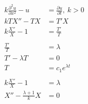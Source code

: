 \documentclass{article}
\begin{document}
\begin{align*}
  k \frac{\partial^2 u}{\partial x^2} - u & = \frac{\partial u}{\partial t},\ k > 0                                                                                                                                                                                                   \\
  k T X'' - T X                           & = T' X                                                                                                                                                                                                                                    \\
  k \frac{X''}{X} - 1                     & = \frac{T'}{T}                                                                                                                                                                                                                            \\ \\
  \frac{T'}{T}                            & = \lambda                                                                                                                                                                                                                                 \\
  T' - \lambda T                          & = 0                                                                                                                                                                                                                                       \\
  T                                       & = c_1 e^{\lambda t}                                                                                                                                                                                                                       \\ \\
  k \frac{X''}{X} - 1                     & = \lambda                                                                                                                                                                                                                                 \\
  X'' - \frac{\lambda + 1}{k} X           & = 0                                                                                                                                                                                                                                       \\

\end{align*}
\end{document}
